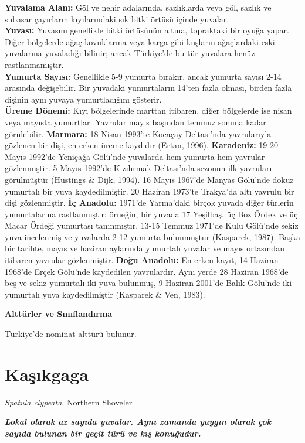 \documentclass[
  a4paper,
  DIV=11,
  numbers=noendperiod]{scrreprt}
\begin{document}
\textbf{Yuvalama Alanı:} Göl ve nehir adalarında, sazlıklarda veya göl,
sazlık ve subasar çayırların kıyılarındaki sık bitki örtüsü içinde
yuvalar.\\
\textbf{Yuvası:} Yuvasını genellikle bitki örtüsünün altına, topraktaki
bir oyuğa yapar. Diğer bölgelerde ağaç kovuklarına veya karga gibi
kuşların ağaçlardaki eski yuvalarına yuvaladığı bilinir; ancak
Türkiye'de bu tür yuvalara henüz rastlanmamıştır.\\
\textbf{Yumurta Sayısı:} Genellikle 5-9 yumurta bırakır, ancak yumurta
sayısı 2-14 arasında değişebilir. Bir yuvadaki yumurtaların 14'ten fazla
olması, birden fazla dişinin aynı yuvaya yumurtladığını gösterir.\\
\textbf{Üreme Dönemi:} Kıyı bölgelerinde marttan itibaren, diğer
bölgelerde ise nisan veya mayısta yumurtlar. Yavrular mayıs başından
temmuz sonuna kadar görülebilir. \textbf{Marmara:} 18 Nisan 1993'te
Kocaçay Deltası'nda yavrularıyla gözlenen bir dişi, en erken üreme
kaydıdır (Ertan, 1996). \textbf{Karadeniz:} 19-20 Mayıs 1992'de Yeniçağa
Gölü'nde yuvalarda hem yumurta hem yavrular gözlenmiştir. 5 Mayıs
1992'de Kızılırmak Deltası'nda sezonun ilk yavruları görülmüştür
(Hustings \& Dijk, 1994). 16 Mayıs 1967'de Manyas Gölü'nde dokuz
yumurtalı bir yuva kaydedilmiştir. 20 Haziran 1973'te Trakya'da altı
yavrulu bir dişi gözlenmiştir. \textbf{İç Anadolu:} 1971'de Yarma'daki
birçok yuvada diğer türlerin yumurtalarına rastlanmıştır; örneğin, bir
yuvada 17 Yeşilbaş, üç Boz Ördek ve üç Macar Ördeği yumurtası
tanınmıştır. 13-15 Temmuz 1971'de Kulu Gölü'nde sekiz yuva incelenmiş ve
yuvalarda 2-12 yumurta bulunmuştur (Kasparek, 1987). Başka bir tarihte,
mayıs ve haziran aylarında yumurtalı yuvalar ve mayıs ortasından
itibaren yavrular gözlenmiştir. \textbf{Doğu Anadolu:} En erken kayıt,
14 Haziran 1968'de Erçek Gölü'nde kaydedilen yavrulardır. Aynı yerde 28
Haziran 1968'de beş ve sekiz yumurtalı iki yuva bulunmuş, 9 Haziran
2001'de Balık Gölü'nde iki yumurtalı yuva kaydedilmiştir (Kasparek \&
Ven, 1983).

\textbf{Alttürler ve Sınıflandırma}

Türkiye'de nominat alttürü bulunur.

\section{Kaşıkgaga}\label{kaux15fux131kgaga}

\emph{Spatula clypeata}, Northern Shoveler

\textbf{\emph{Lokal olarak az sayıda yuvalar. Aynı zamanda yaygın olarak
çok sayıda bulunan bir geçit türü ve kış konuğudur.}}
\end{document}
